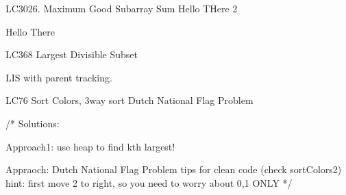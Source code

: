 \begin{problem}{LC3026. Maximum Good Subarray Sum}
    Hello THere 2
\end{problem}

\begin{solution}

    \begin{code3}
        Hello There
    \end{code3}
\end{solution}

\begin{problem}{LC368 Largest Divisible Subset}
\end{problem}

\begin{solution}[Pure LIS (=ending at idx)]

    LIS with parent tracking.
\end{solution}

\begin{problem}{LC76 Sort Colors, 3way sort}
    Dutch National Flag Problem
\end{problem}

\begin{solution}[hints]
    \begin{code2}
    /* Solutions:

    Approach1: use heap to find kth largest!

    Appraoch: Dutch National Flag Problem
        tips for clean code (check sortColors2)
        hint: first move 2 to right, so you need to worry about 0,1 ONLY
    */
    \end{code2}
\end{solution}

